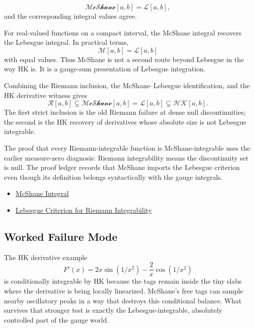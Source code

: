 \begin{remark*}
\[
\mathcal{McShane}[a,b]=\mathcal L[a,b],
\]
and the corresponding integral values agree.
\end{remark*}

\begin{remark*}[Interpretation]
For real-valued functions on a compact interval, the McShane integral recovers
the Lebesgue integral. In practical terms,
\[
  \mathcal M[a,b]=\mathcal L[a,b]
\]
with equal values. Thus McShane is not a second route beyond Lebesgue in the
way HK is. It is a gauge-sum presentation of Lebesgue integration.


Combining the Riemann inclusion, the McShane--Lebesgue identification, and the
HK derivative witness gives
\[
  \mathcal R[a,b]\subsetneq \mathcal{McShane}[a,b]
  =\mathcal L[a,b]\subsetneq\mathcal{HK}[a,b].
\]
The first strict inclusion is the old Riemann failure at dense null
discontinuities; the second is the HK recovery of derivatives whose absolute
size is not Lebesgue integrable.


The proof that every Riemann-integrable function is McShane-integrable uses
the earlier measure-zero diagnosis: Riemann integrability means the
discontinuity set is null. The proof ledger records that McShane imports the
Lebesgue criterion even though its definition belongs syntactically with the
gauge integrals.
\end{remark*}

\begin{dependencies}
\begin{itemize}
  \item \hyperref[def:mcshane-integral]{McShane Integral}
  \item \hyperref[thm:lebesgue-criterion-riemann-integrability]{Lebesgue Criterion for Riemann Integrability}
\end{itemize}
\end{dependencies}

\subsection*{Worked Failure Mode}

\begin{remark*}[Interpretation]
The HK derivative example
\[
  F'(x)=2x\sin(1/x^2)-\frac{2}{x}\cos(1/x^2)
\]
is conditionally integrable by HK because the tags remain inside the tiny
slabs where the derivative is being locally linearized. McShane's free tags
can sample nearby oscillatory peaks in a way that destroys this conditional
balance. What survives that stronger test is exactly the Lebesgue-integrable,
absolutely controlled part of the gauge world.
\end{remark*}

